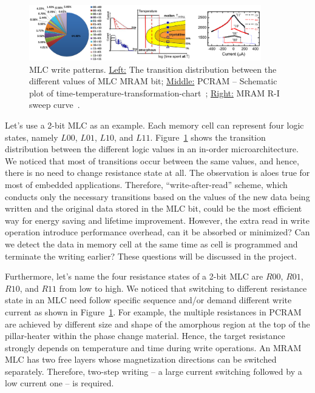 \begin{figure}
\centering
\vspace{-10pt}
\includegraphics[width=0.9\textwidth]{./figure/4_mlc.pdf}
\vspace{-10pt}
\caption{MLC write patterns. \underline{Left:} The transition distribution between the different values of MLC MRAM bit; \underline{Middle:} PCRAM -- Schematic plot of time-temperature-transformation-chart~\cite{Nirschl07}; \underline{Right:} MRAM R-I sweep curve~\cite{Lou08}.}
\label{mlc}
\vspace{-10pt}
\end{figure}

Let's use a 2-bit MLC as an example. Each memory cell can represent four logic states, namely $L00$, $L01$, $L10$, and $L11$.  Figure~\ref{mlc} shows the transition distribution between the different logic values in an in-order microarchitecture. We noticed that most of transitions occur between the same values, and hence, there is no need to change resistance state at all. The observation is aloes true for most of embedded applications. Therefore, ``write-after-read'' scheme, which conducts only the necessary transitions based on the values of the new data being written and the original data stored in the MLC bit, could be the most efficient way for energy saving and lifetime improvement. However, the extra read in write operation introduce performance overhead, can it be absorbed or minimized? Can we detect the data in memory cell at the same time as cell is programmed and terminate the writing earlier? These questions will be discussed in the project.

Furthermore, let's name the four resistance states of a 2-bit MLC are $R00$, $R01$, $R10$, and $R11$ from low to high. We noticed that switching to different resistance state in an MLC need follow specific sequence and/or demand different write current as shown in Figure~\ref{mlc}. For example, the multiple resistances in PCRAM are achieved by different size and shape of the amorphous region at the top of the pillar-heater within the phase change material. Hence, the target resistance strongly depends on temperature and time during write operations. An MRAM MLC has two free layers whose magnetization directions can be switched separately. Therefore, two-step writing -- a large current switching followed by a low current one -- is required.


